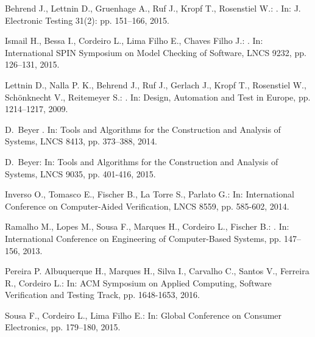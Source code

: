 \documentclass{acm_sen_article}
\begin{document}
{\begin{thebibliography}{1}
Behrend J., Lettnin D., Gruenhage A., Ruf J., Kropf T., Rosenstiel W.:
. 
\newblock In: J. Electronic Testing 31(2): pp. 151--166, 2015.

Ismail H., Bessa I., Cordeiro L., Lima Filho E., Chaves Filho J.:
. 
\newblock In: International SPIN Symposium on Model Checking of Software, LNCS 9232, pp. 126--131, 2015.

Lettnin D., Nalla P. K., Behrend J., Ruf J., Gerlach J., Kropf T., Rosenstiel W., Sch{\"o}nknecht V., Reitemeyer S.:
. 
\newblock In: Design, Automation and Test in Europe, pp. 1214--1217, 2009.

D.~Beyer 
. 
\newblock In: Tools and Algorithms for the Construction and Analysis of Systems, LNCS 8413, pp. 373--388, 2014.
 
D.~Beyer:
\newblock In: Tools and Algorithms for the Construction and Analysis of Systems, LNCS 9035, pp. 401-416, 2015.

Inverso O., Tomasco E., Fischer B., La Torre S., Parlato G.:
\newblock In: International Conference on Computer-Aided Verification, LNCS 8559, pp. 585-602, 2014.

Ramalho M., Lopes M., Sousa F., Marques H., Cordeiro L., Fischer B.:
.
\newblock In: International Conference on Engineering of Computer-Based Systems, pp. 147--156, 2013.

Pereira P.  Albuquerque H., Marques H., Silva I., Carvalho C., Santos V., Ferreira R., Cordeiro L.: 
\newblock In: ACM Symposium on Applied Computing, Software Verification and Testing Track, pp. 1648-1653, 2016. 

Sousa F., Cordeiro L., Lima Filho E.: 
\newblock In: Global Conference on Consumer Electronics, pp. 179--180, 2015.


\end{thebibliography}}
\end{document}
